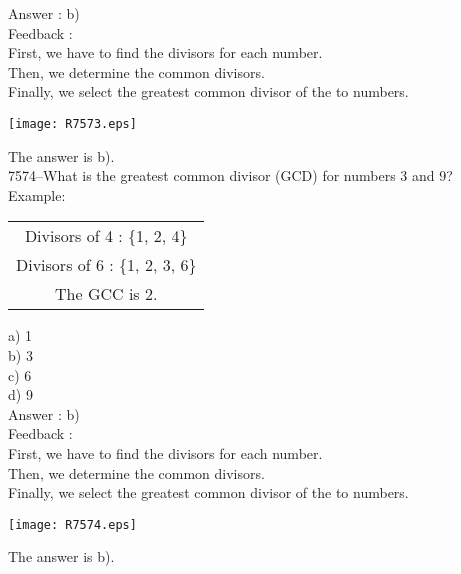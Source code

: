 \documentclass[letterpaper, 12pt]{article}
\begin{document}
Answer : b)\\

Feedback :\\
First, we have to find the divisors for each number.\\
Then, we determine the common divisors.\\
Finally, we select the greatest common divisor of the to numbers.\\
\begin{center}
\texttt{[image: R7573.eps]}\\
\end{center}
The answer is b).\\



7574--What is the greatest common divisor (GCD) for numbers 3 and 9?\\
Example:\\
\begin{center}
\begin{tabular}{|c|}
\hline
Divisors of 4 : \{1, 2, 4\}\\
Divisors of 6 : \{1, 2, 3, 6\}\\
The GCC is 2.\\
\hline
\end{tabular}
\end{center}

a) 1\\
b) 3\\
c) 6\\
d) 9\\

Answer : b)\\

Feedback :\\
First, we have to find the divisors for each number.\\
Then, we determine the common divisors.\\
Finally, we select the greatest common divisor of the to numbers.\\
\begin{center}
\texttt{[image: R7574.eps]}\\
\end{center}
The answer is b).\\
\end{document}

